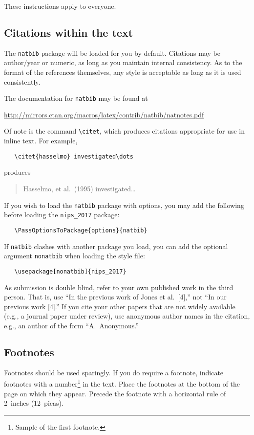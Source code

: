 \documentclass{article}
\begin{document}
These instructions apply to everyone.

\subsection{Citations within the text}

The \verb+natbib+ package will be loaded for you by default.
Citations may be author/year or numeric, as long as you maintain
internal consistency.  As to the format of the references themselves,
any style is acceptable as long as it is used consistently.

The documentation for \verb+natbib+ may be found at
\begin{center}
  \url{http://mirrors.ctan.org/macros/latex/contrib/natbib/natnotes.pdf}
\end{center}
Of note is the command \verb+\citet+, which produces citations
appropriate for use in inline text.  For example,
\begin{verbatim}
   \citet{hasselmo} investigated\dots
\end{verbatim}
produces
\begin{quote}
  Hasselmo, et al.\ (1995) investigated\dots
\end{quote}

If you wish to load the \verb+natbib+ package with options, you may
add the following before loading the \verb+nips_2017+ package:
\begin{verbatim}
   \PassOptionsToPackage{options}{natbib}
\end{verbatim}

If \verb+natbib+ clashes with another package you load, you can add
the optional argument \verb+nonatbib+ when loading the style file:
\begin{verbatim}
   \usepackage[nonatbib]{nips_2017}
\end{verbatim}

As submission is double blind, refer to your own published work in the
third person. That is, use ``In the previous work of Jones et
al.\ [4],'' not ``In our previous work [4].'' If you cite your other
papers that are not widely available (e.g., a journal paper under
review), use anonymous author names in the citation, e.g., an author
of the form ``A.\ Anonymous.''

\subsection{Footnotes}

Footnotes should be used sparingly.  If you do require a footnote,
indicate footnotes with a number\footnote{Sample of the first
  footnote.} in the text. Place the footnotes at the bottom of the
page on which they appear.  Precede the footnote with a horizontal
rule of 2~inches (12~picas).
\end{document}

